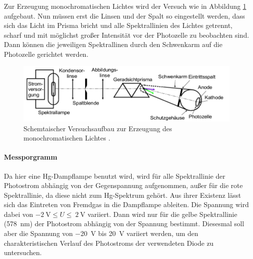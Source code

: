 Zur Erzeugung monochromatischen Lichtes wird der Versuch wie in Abbildung
\ref{fig:VAO} aufgebaut. Nun müssen erst die Linsen und der Spalt so eingestellt
werden, dass sich das Licht im Prisma bricht und alle Spektrallinien des Lichtes
getrennt, scharf und mit möglichst großer Intensität vor der Photozelle zu beobachten
sind. Dann können die jeweiligen Spektrallinen durch den Schwenkarm auf die
Photozelle gerichtet werden.

\begin{figure}
  \centering
  \includegraphics[height=3cm]{logos/VAOptisch.png}
  \caption{Schemtaischer Versuchsaufbau zur Erzeugung des monochromatischen Lichtes \cite{Anleitung}.}
  \label{fig:VAO}
\end{figure}

\paragraph{Messporgramm}
Da hier eine Hg-Dampflampe benutzt wird, wird für alle Spektrallinie der
Photostrom abhängig von der Gegenspannung aufgenommen, außer für die rote Spektrallinie, da diese nicht zum Hg-Spektrum gehört. Aus ihrer Existenz lässt sich das Eintreten von Fremdgas in die Dampflampe ableiten.
Die Spannung wird dabei von $ \SI{-2}{\volt} \leq U \leq \ \SI{2}{\volt}$ variiert.
Dann wird nur für die gelbe Spektrallinie (\SI{578}{\nano\meter}) der Photostrom
abhängig von der Spannung bestimmt. Diesesmal soll aber die Spannung von
\SI{-20}{\volt} bis \SI{20}{\volt} variiert werden, um den charakteristischen Verlauf des Photostroms der verwendeten Diode zu untersuchen.
